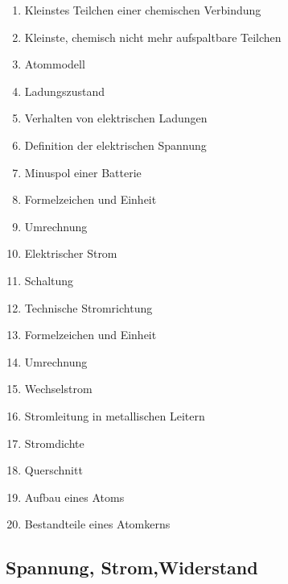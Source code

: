 \begin{enumerate}
\item
  Kleinstes Teilchen einer chemischen Verbindung\\
\item
  Kleinste, chemisch nicht mehr aufspaltbare Teilchen\\
\item
  Atommodell\\
\item
  Ladungszustand\\
\item
  Verhalten von elektrischen Ladungen\\
\item
  Definition der elektrischen Spannung\\
\item
  Minuspol einer Batterie\\
\item
  Formelzeichen und Einheit\\
\item
  Umrechnung\\
\item
  Elektrischer Strom\\
\item
  Schaltung\\
\item
  Technische Stromrichtung\\
\item
  Formelzeichen und Einheit\\
\item
  Umrechnung\\
\item
  Wechselstrom\\
\item
  Stromleitung in metallischen Leitern\\
\item
  Stromdichte\\
\item
  Querschnitt\\
\item
  Aufbau eines Atoms\\
\item
  Bestandteile eines Atomkerns
\end{enumerate}

\subsection{Spannung, Strom,Widerstand}\label{spannung-stromwiderstand}

